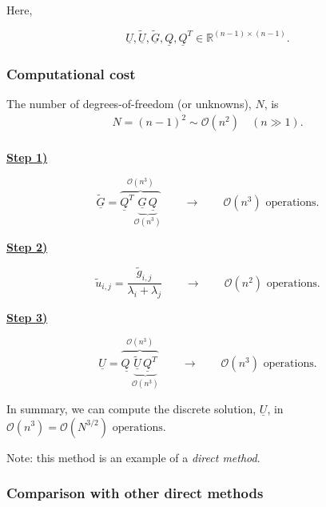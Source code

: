 \documentclass[11pt]{article}
\begin{document}
Here,

\begin{equation*}
  \underline{{U}}, \underline{{\widetilde{U}}}, \underline{{\widetilde{G}}}, \underline{{Q}}, \underline{{Q}}^T \in \mathbb{R}^{(n-1) \times (n-1)}.
\end{equation*}


\subsubsection{Computational cost}

The number of degrees-of-freedom (or unknowns), $N$, is
\begin{align*}
N = (n-1)^2 \sim \mathcal{O}(n^2) \quad (n \gg 1).\\
\end{align*}

\underline{\textbf{Step 1)}}

\begin{equation*}
  \underline{{\widetilde{G}}} = \overset{\mathcal{O}(n^3)}{\overbrace{\underline{{Q}}^T \underset{\mathcal{O}(n^3)}{\underbrace{\underline{{G}}\, \underline{{Q}}}}}} \qquad \longrightarrow \qquad \mathcal{O}(n^3) \text{ operations}.
\end{equation*}

\underline{\textbf{Step 2)}}

\begin{equation*}
  \widetilde{u}_{i,j} = \frac{\widetilde{g}_{i,j}}{\lambda_i + \lambda_j} \qquad \longrightarrow \qquad \mathcal{O}(n^2) \text{ operations}.
\end{equation*}

\underline{\textbf{Step 3)}}

\begin{equation*}
  \underline{{U}} = \overset{\mathcal{O}(n^3)}{\overbrace{\underline{{Q}\,} \underset{\mathcal{O}(n^3)}{\underbrace{\underline{{\widetilde{U}}} \,\underline{{Q}}^T}}}} \qquad \longrightarrow \qquad \mathcal{O}(n^3) \text{ operations}.
\end{equation*}

In summary, we can compute the discrete solution, $\underline{{U}}$, in $\mathcal{O}(n^3)=\mathcal{O}(N^{3/2}) \text{ operations}$.


Note: this method is an example of a {\em direct method}.


\subsubsection{Comparison with other direct methods}
\end{document}
